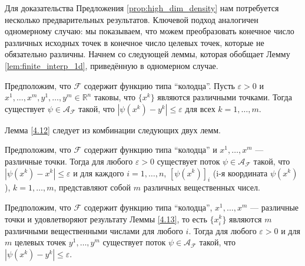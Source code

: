 \documentclass[../NDCNNAI_main.tex]{subfiles}
\begin{document}
Для доказательства Предложения \ref{prop:high_dim_density} нам потребуется несколько предварительных результатов. Ключевой подход аналогичен одномерному случаю: мы показываем, что можем преобразовать конечное число различных исходных точек в конечное число целевых точек, которые не обязательно различны. Начнем со следующей леммы, которая обобщает Лемму \ref{lem:finite_interp_1d}, приведённую в одномерном случае.

\begin{lemma}[4.12]\label{4.12}
Предположим, что \(\mathcal{F}\) содержит функцию типа ``колодца''. Пусть \(\varepsilon > 0\) и \(x^1, \ldots, x^m, y^1, \ldots, y^m \in \mathbb{R}^n\) таковы, что \(\{x^k\}\) являются различными точками. Тогда существует \(\psi \in \mathcal{A}_{\mathcal{F}}\) такой, что \(|\psi(x^k) - y^k| \leq \varepsilon\) для всех \(k = 1, \ldots, m\).
\end{lemma}

Лемма \ref{4.12} следует из комбинации следующих двух лемм.

\begin{lemma}[4.13]\label{4.13}
Предположим, что \(\mathcal{F}\) содержит функцию типа ``колодца'' и \(x^1, \ldots, x^m\) --- различные точки. Тогда для любого \(\varepsilon > 0\) существует поток \(\psi \in \mathcal{A}_{\mathcal{F}}\) такой, что \(|\psi(x^k) - x^k| \leq \varepsilon\) и для каждого \(i = 1, \ldots, n\), \([\psi(x^k)]_i\) (i-я координата \(\psi(x^k)\)), \(k = 1, \ldots, m\), представляют собой \(m\) различных вещественных чисел.
\end{lemma}

\begin{lemma}[4.14]\label{4.14}
Предположим, что \(\mathcal{F}\) содержит функцию типа ``колодца'', \(x^1, \ldots, x^m\) --- различные точки и удовлетворяют результату Леммы \ref{4.13}, то есть \(\{x_i^k\}\) являются \(m\) различными вещественными числами для любого \(i\). Тогда для любого \(\varepsilon > 0\) и для \(m\) целевых точек \(y^1, \ldots, y^m\) существует поток \(\psi \in \mathcal{A}_{\mathcal{F}}\) такой, что \(|\psi(x^k) - y^k| \leq \varepsilon\).
\end{lemma}
\end{document}
